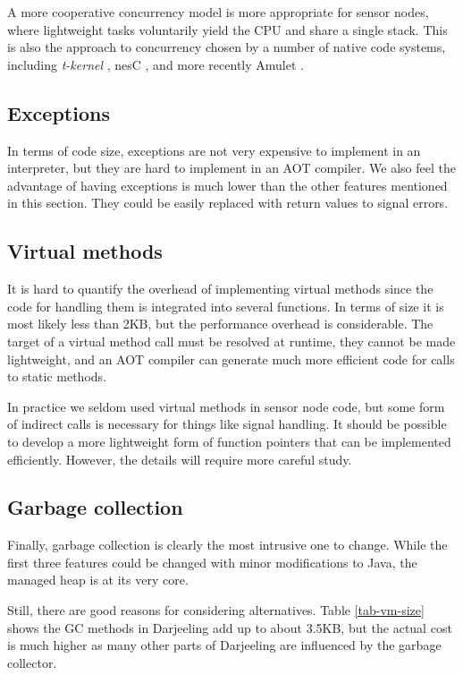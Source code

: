 A more cooperative concurrency model is more appropriate for sensor nodes, where lightweight tasks voluntarily yield the CPU and share a single stack. This is also the approach to concurrency chosen by a number of native code systems, including \emph{t-kernel} \cite{Gu:2005un}, nesC \cite{Gay:2003up}, and more recently Amulet \cite{Hester:2016je}.


\subsection{Exceptions}
In terms of code size, exceptions are not very expensive to implement in an interpreter, but they are hard to implement in an AOT compiler. We also feel the advantage of having exceptions is much lower than the other features mentioned in this section. They could be easily replaced with return values to signal errors.


\subsection{Virtual methods}
It is hard to quantify the overhead of implementing virtual methods since the code for handling them is integrated into several functions. In terms of size it is most likely less than 2KB, but the performance overhead is considerable. The target of a virtual method call must be resolved at runtime, they cannot be made lightweight, and an AOT compiler can generate much more efficient code for calls to static methods.

In practice we seldom used virtual methods in sensor node code, but some form of indirect calls is necessary for things like signal handling. It should be possible to develop a more lightweight form of function pointers that can be implemented efficiently. However, the details will require more careful study.


\subsection{Garbage collection}
Finally, garbage collection is clearly the most intrusive one to change. While the first three features could be changed with minor modifications to Java, the managed heap is at its very core.

Still, there are good reasons for considering alternatives. Table \ref{tab-vm-size} shows the GC methods in Darjeeling add up to about 3.5KB, but the actual cost is much higher as many other parts of Darjeeling are influenced by the garbage collector.

